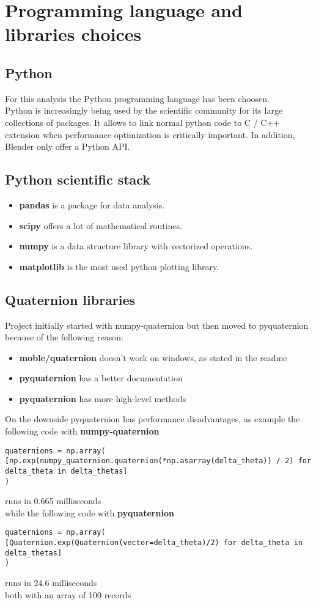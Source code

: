\chapter{Programming language and libraries choices}
\label{chap:programming_language_libraries_choices}

\section{Python}
For this analysis the Python programming language has been choosen. \\
Python is increasingly being used by the scientific community for its large collections of packages. It allows to link normal python code to C / C++ extension when performance optimization is critically important.
In addition, Blender only offer a Python API.

\section{Python scientific stack}
\begin{itemize}
	\item \textbf{pandas} is a package for data analysis.
	\item \textbf{scipy} offers a lot of mathematical routines.
	\item \textbf{numpy} is a data structure library with vectorized operations.
	\item \textbf{matplotlib} is the most used python plotting library.
\end{itemize}

\section{Quaternion libraries}

Project initially started with numpy-quaternion \cite{numpy-quaternion} but then moved to pyquaternion \cite{pyquaternion} because of the following reason:
\begin{itemize}
\item \textbf{moble/quaternion} doesn't work on windows, as stated in the readme
\item \textbf{pyquaternion} has a better documentation
\item \textbf{pyquaternion} has more high-level methods
\end{itemize}

On the downside pyquaternion has performance disadvantages, as example the following code with \textbf{numpy-quaternion}
\begin{lstlisting}
quaternions = np.array(
[np.exp(numpy_quaternion.quaternion(*np.asarray(delta_theta)) / 2) for delta_theta in delta_thetas]
)
\end{lstlisting}
runs in 0.665 milliseconds \\
while the following code with \textbf{pyquaternion} 
\begin{lstlisting}
quaternions = np.array(
[Quaternion.exp(Quaternion(vector=delta_theta)/2) for delta_theta in delta_thetas]
)
\end{lstlisting}
runs in 24.6 milliseconds \\
both with an array of 100 records
